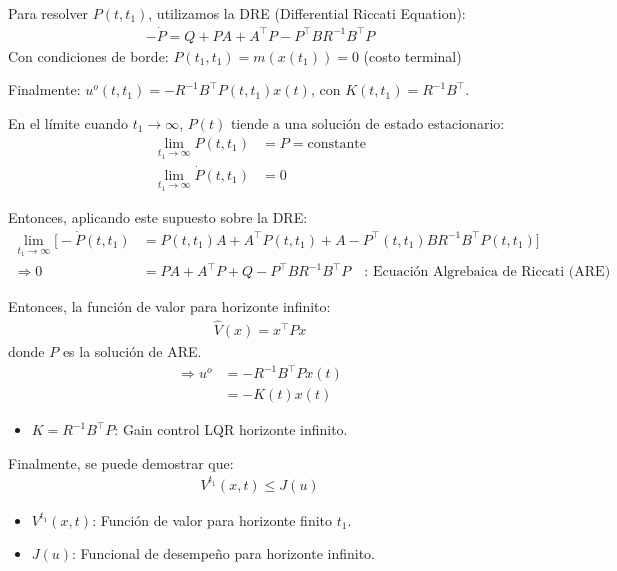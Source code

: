 Para resolver $P(t,t_1)$, utilizamos la DRE (Differential Riccati Equation):
\begin{align*}
    -\dot{P}=Q+PA+A^\top P-P^\top BR^{-1}B^\top P
\end{align*}
Con condiciones de borde: $P(t_1,t_1)=m(x(t_1))=0$ (costo terminal)\\
\par Finalmente: $u^o(t,t_1)=-R^{-1}B^\top P(t,t_1)x(t)$, con $K(t,t_1)=R^{-1}B^\top$.\\
\par En el límite cuando $t_1\to\infty$, $P(t)$ tiende a una solución de estado estacionario:
\begin{align*}
    \lim_{t_1\to\infty}P(t,t_1)&=P=\text{constante}\\
    \lim_{t_1\to\infty}\dot{P}(t,t_1)&=0
\end{align*}

Entonces, aplicando este supuesto sobre la DRE:
\begin{align*}
    \lim_{t_1\to \infty} \Big[-\dot{P}(t,t_1) &= P(t,t_1)A+A^\top P(t,t_1)+A-P^\top (t,t_1)BR^{-1}B^\top P(t,t_1)  \Big] \\
    \Longrightarrow 0 &= PA+A^\top P+Q-P^\top BR^{-1}B^\top P \quad \text{: Ecuación Algrebaica de Riccati (ARE)}
\end{align*}

Entonces, la función de valor para horizonte infinito:
\begin{align*}
    \hat{V}(x)=x^\top Px
\end{align*}
donde $P$ es la solución de ARE.
\begin{align*}
    \Longrightarrow u^o &= -R^{-1}B^\top Px(t)\\
    &= -K(t)x(t)
\end{align*}
\begin{itemize}
    \item $K=R^{-1}B^\top P$: Gain control LQR horizonte infinito.
\end{itemize}
Finalmente, se puede demostrar que:
\begin{align*}
    V^{t_1}(x,t) \leq J(u)
\end{align*}
\begin{itemize}
    \item $V^{t_1}(x,t)$: Función de valor para horizonte finito $t_1$.
    \item $J(u)$: Funcional de desempeño para horizonte infinito.
\end{itemize}

